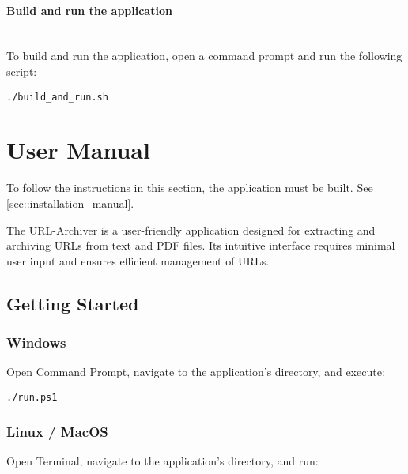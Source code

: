 \paragraph{Build and run the application}
\mbox{}\\
To build and run the application, open a command prompt and run the following script:

\begin{lstlisting}[numbers=none, caption={Script to Build and Run the URL-Archiver Application on Linux and macOS}, label={lst:build_run_unix}]
./build_and_run.sh
\end{lstlisting}



\section{User Manual}
\begin{bfhWarnBox}
	To follow the instructions in this section, the application must be built. See \ref{sec::installation_manual}.
\end{bfhWarnBox}

The URL-Archiver is a user-friendly application designed for extracting and archiving URLs from text and PDF files. Its intuitive interface requires minimal user input and ensures efficient management of URLs.

\subsection{Getting Started}

\subsubsection{Windows}

Open Command Prompt, navigate to the application's directory, and execute:

\begin{lstlisting}[numbers=none, caption={Script to Run the URL-Archiver Application on Windows (User Manual)}, label={lst:user_run_win}]
./run.ps1
\end{lstlisting}


\subsubsection{Linux / MacOS}

Open Terminal, navigate to the application's directory, and run:


